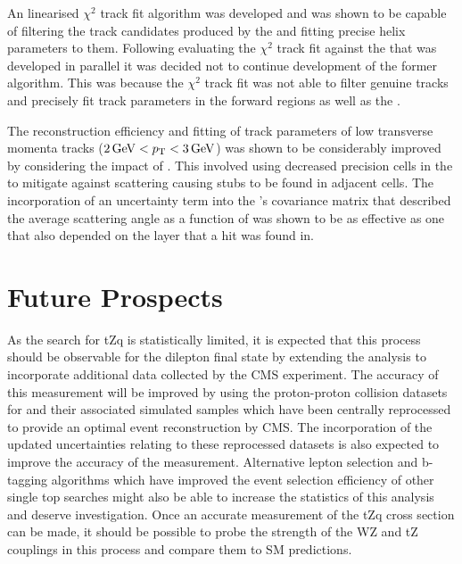 An linearised $\chi^{2}$ track fit algorithm was developed and was shown to be capable of filtering the track candidates produced by the \HT and fitting precise helix parameters to them.
Following evaluating the $\chi^{2}$ track fit against the \KF that was developed in parallel it was decided not to continue development of the former algorithm.
This was because the $\chi^{2}$ track fit was not able to filter genuine tracks and precisely fit track parameters in the forward regions as well as the \KF.

The reconstruction efficiency and fitting of track parameters of low transverse momenta tracks ($2\,\text{Ge\hspace{-.08em}V} < p_{\mathrm{T}} < 3\,\text{Ge\hspace{-.08em}V}$) was shown to be considerably improved by considering the impact of \MS.
This involved using decreased precision cells in the \HT to mitigate against scattering causing stubs to be found in adjacent \HT cells.
The incorporation of an uncertainty term into the \KF's covariance matrix that described the average scattering angle as a function of \pT was shown to be as effective as one that also depended on the layer that a hit was found in.


\section{Future Prospects}
As the search for tZq is statistically limited, it is expected that this process should be observable for the dilepton final state by extending the analysis to incorporate additional data collected by the CMS experiment.
The accuracy of this measurement will be improved by using the proton-proton collision datasets for and their associated simulated samples which have been centrally reprocessed to provide an optimal event reconstruction by CMS.
The incorporation of the updated uncertainties relating to these reprocessed datasets is also expected to improve the accuracy of the measurement.
Alternative lepton selection and b-tagging algorithms which have improved the event selection efficiency of other single top searches might also be able to increase the statistics of this analysis and deserve investigation.
Once an accurate measurement of the tZq cross section can be made, it should be possible to probe  the strength of the WZ and tZ couplings in this process and compare them to SM predictions.

